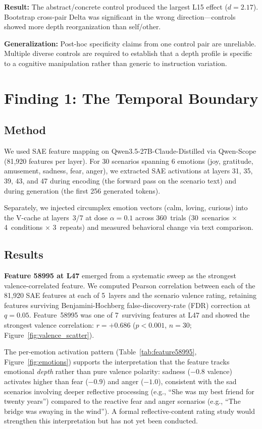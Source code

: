 \documentclass[11pt,a4paper]{article}
\begin{document}
\textbf{Result:} The abstract/concrete control produced the largest L15
effect ($d{=}2.17$). Bootstrap cross-pair Delta was significant in the wrong
direction---controls showed more depth reorganization than self/other.

\textbf{Generalization:} Post-hoc specificity claims from one control pair
are unreliable. Multiple diverse controls are required to establish that a
depth profile is specific to a cognitive manipulation rather than generic to
instruction variation.

\section{Finding 1: The Temporal Boundary}
\label{sec:temporal}

\subsection{Method}

We used SAE feature mapping on Qwen3.5-27B-Claude-Distilled via
Qwen-Scope (81,920 features per layer). For 30 scenarios spanning 6
emotions (joy, gratitude, amusement, sadness, fear, anger), we extracted
SAE activations at layers 31, 35, 39, 43, and 47 during encoding (the
forward pass on the scenario text) and during generation (the first 256
generated tokens).

Separately, we injected circumplex emotion vectors (calm, loving, curious)
into the V-cache at layers~3/7 at dose $\alpha{=}0.1$ across 360~trials
(30~scenarios $\times$ 4~conditions $\times$ 3~repeats) and measured
behavioral change via text comparison.

\subsection{Results}

\textbf{Feature 58995 at L47} emerged from a systematic sweep as the
strongest valence-correlated feature. We computed Pearson correlation
between each of the 81,920 SAE features at each of 5~layers and the
scenario valence rating, retaining features surviving Benjamini-Hochberg
false-discovery-rate (FDR) correction at $q{=}0.05$. Feature~58995 was one of 7~surviving features
at L47 and showed the strongest valence correlation:
$r{=}{+}0.686$ ($p{<}0.001$, $n{=}30$; Figure~\ref{fig:valence_scatter}).

The per-emotion activation pattern (Table~\ref{tab:feature58995},
Figure~\ref{fig:emotions}) supports the interpretation that the feature
tracks emotional \emph{depth} rather than pure valence polarity: sadness
($-0.8$ valence) activates higher than fear ($-0.9$) and anger ($-1.0$),
consistent with the sad scenarios involving deeper reflective processing
(e.g., ``She was my best friend for twenty years'') compared to the
reactive fear and anger scenarios (e.g., ``The bridge was swaying in the
wind''). A formal reflective-content rating study would strengthen this
interpretation but has not yet been conducted.
\end{document}
